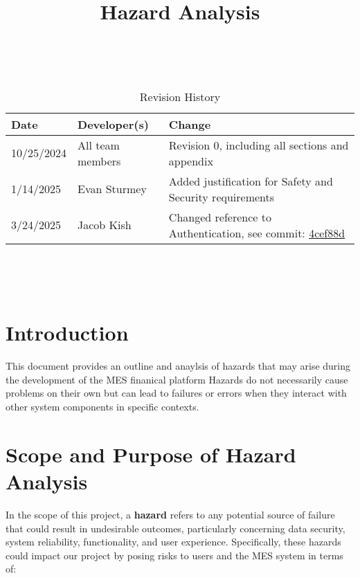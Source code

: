 \documentclass{article}
\title{Hazard Analysis\\\progname}
\author{\authname}
\date{}
\begin{document}
\maketitle
\thispagestyle{empty}

~\newpage


\begin{table}[hp]
\caption{Revision History} \label{TblRevisionHistory}
\begin{tabularx}{\textwidth}{llX}
\toprule
\textbf{Date} & \textbf{Developer(s)} & \textbf{Change}\\
\midrule
10/25/2024 & All team members & Revision 0, including all sections and appendix\\
\midrule
1/14/2025 & Evan Sturmey & Added justification for Safety and Security requirements\\
\midrule
3/24/2025 & Jacob Kish & Changed reference to Authentication, see commit: \href{https://github.com/ausbennett/mes-finance-platform/commit/4cef88de4d7c2a664fa8e2395804251c0a6baeb4}{4cef88d}\\

\bottomrule
\end{tabularx}
\end{table}

~\newpage

\tableofcontents

~\newpage


\section{Introduction}

This document provides an outline and anaylsis of hazards that may arise during the development of the MES finanical platform Hazards do not necessarily cause problems on their own but can lead to failures or errors when they interact with other system components in specific contexts.

\section{Scope and Purpose of Hazard Analysis}

In the scope of this project, a \textbf{hazard} refers to any potential source of failure that could result in undesirable outcomes, particularly concerning data security, system reliability, functionality, and user experience. Specifically, these hazards could impact our project by posing risks to users and the MES system in terms of:
\end{document}
